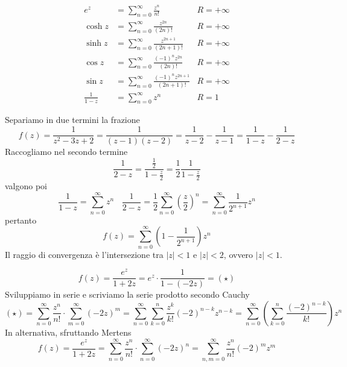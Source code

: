 \begin{rem}
\begin{align*}
e^{z} & = \sum^{\infty}_{n = 0}\frac{z^{n}}{n!} & R = +\infty \\
\cosh z & = \sum^{\infty}_{n = 0}\frac{z^{2n}}{(2n)!} & R = +\infty \\
\sinh z & = \sum^{\infty}_{n = 0}\frac{z^{2n + 1}}{(2n + 1)!} & R = +\infty \\
\cos z & = \sum^{\infty}_{n = 0}\frac{(- 1)^{n} z^{2n}}{(2n)!} & R = +\infty \\
\sin z & = \sum^{\infty}_{n = 0}\frac{(- 1)^{n} z^{2n + 1}}{(2n + 1)!} & R = +\infty \\
\frac{1}{1 - z} & = \sum^{\infty}_{n = 0} z^{n} & R = 1
\end{align*}
\end{rem}
Separiamo in due termini la frazione
\begin{equation*}
f(z) = \frac{1}{z^{2} - 3z + 2} = \frac{1}{(z - 1)(z - 2)} = \frac{1}{z - 2} - \frac{1}{z - 1} = \frac{1}{1 - z} - \frac{1}{2 - z}
\end{equation*}
Raccogliamo nel secondo termine
\begin{equation*}
\frac{1}{2 - z} = \frac{\frac{1}{2}}{1 - \frac{z}{2}} = \frac{1}{2}\frac{1}{1 - \frac{z}{2}}
\end{equation*}
valgono poi
\begin{equation*}
\frac{1}{1 - z} = \sum^{\infty}_{n = 0} z^{n} \ \ \ \ \frac{1}{2 - z} = \frac{1}{2}\sum^{\infty}_{n = 0}\left(\frac{z}{2}\right)^{n} = \sum^{\infty}_{n = 0}\frac{1}{2^{n + 1}} z^{n}
\end{equation*}
pertanto
\begin{equation*}
f(z) = \sum^{\infty}_{n = 0}\left(1 - \frac{1}{2^{n + 1}}\right) z^{n}
\end{equation*}
Il raggio di convergenza è l'intersezione tra $|z| < 1$ e $|z| < 2$, ovvero $|z| < 1$.

\Soluzione

\begin{equation*}
f(z) = \frac{e^{z}}{1 + 2z} = e^{z} \cdot \frac{1}{1 - (- 2z)} = (\star)
\end{equation*}
Sviluppiamo in serie e scriviamo la serie prodotto secondo Cauchy
\begin{equation*}
(\star) = \sum^{\infty}_{n = 0}\frac{z^{n}}{n!} \cdot \sum^{\infty}_{m = 0} (- 2z)^{m} = \sum^{\infty}_{n = 0}\sum^{n}_{k = 0}\frac{z^{k}}{k!} (- 2)^{n - k} z^{n - k} = \sum^{\infty}_{n = 0}\left(\sum^{n}_{k = 0}\frac{(- 2)^{n - k}}{k!}\right) z^{n}
\end{equation*}
In alternativa, sfruttando Mertens
\begin{equation*}
f(z) = \frac{e^{z}}{1 + 2z} = \sum^{\infty}_{n = 0}\frac{z^{n}}{n!} \cdot \sum^{\infty}_{n = 0} (- 2z)^{n} = \sum^{\infty}_{n, m = 0}\frac{z^{n}}{n!} (- 2)^{m} z^{m}
\end{equation*}

